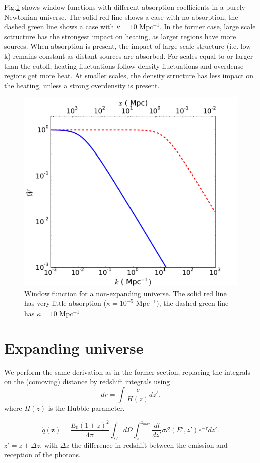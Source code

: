 \documentclass[twocolumns]{emulateapj}
\begin{document}
Fig.\ref{fig:window_newt} shows  window functions with different absorption coefficients in a purely Newtonian universe. The solid red line shows a case with no absorption, the dashed green line shows a case with $\kappa=10$ Mpc$^{-1}$.  In the former case, large scale sctructure has the strongest impact on heating, as larger regions have more sources. When absorption is present,  the impact of large scale structure (i.e. low k) remains constant as distant sources are absorbed. For scales equal to or larger than the cutoff, heating fluctuations follow density fluctuations and overdense regions get more heat. At smaller scales, the density structure has less impact on the heating, unless a strong overdensity is present.  

\begin{figure}
  \centering
  \includegraphics[width = .45\textwidth ]{newtonian_window}
  \caption{Window function for a non-expanding universe. The solid red line has very little absorption ($\kappa=10^{-5}$ Mpc$^{-1}$), the dashed green line has $\kappa=10 $ Mpc$^{-1}$ .}
  \label{fig:window_newt}
\end{figure}



\section{Expanding universe}\label{sec:window_exp}

We perform the same derivation as in the former section, replacing the integrals on the (comoving) distance by redshift integrals using
\begin{equation}
  \label{eq:proper_dist}
  dr=\int \frac{c}{H(z)} dz'.
\end{equation}
where  $H(z)$ is the Hubble parameter.


\begin{equation}
  \label{eq:int_exp_heat}
  \dot{q}(\mathbf{z})=\frac{E_0(1+z)^2}{4\pi}\int_{\Omega}d\Omega\int_z^{z_{max}}\frac{dl}{dz'}\sigma\mathcal{E}(E',z') e^{-\tau} dz'.
\end{equation}
 $z'=z+\Delta z$, with $\Delta z$ the difference in redshift between the emission and reception of the photons.
\end{document}
